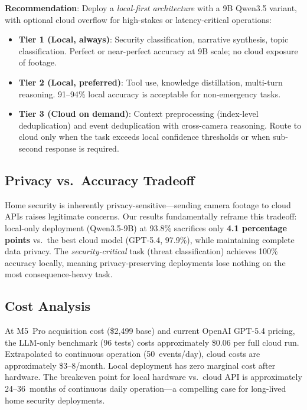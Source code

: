 \documentclass[onecolumn,10pt]{IEEEtran}
\begin{document}
\textbf{Recommendation}: Deploy a \emph{local-first architecture}
with a 9B Qwen3.5 variant, with optional cloud overflow for
high-stakes or latency-critical operations:
\begin{itemize}[nosep]
    \item \textbf{Tier 1 (Local, always)}: Security classification,
    narrative synthesis, topic classification. Perfect or near-perfect
    accuracy at 9B scale; no cloud exposure of footage.
    \item \textbf{Tier 2 (Local, preferred)}: Tool use, knowledge
    distillation, multi-turn reasoning. 91--94\% local accuracy is
    acceptable for non-emergency tasks.
    \item \textbf{Tier 3 (Cloud on demand)}: Context preprocessing
    (index-level deduplication) and event deduplication with
    cross-camera reasoning. Route to cloud only when the task exceeds
    local confidence thresholds or when sub-second response is required.
\end{itemize}

\subsection{Privacy vs.\ Accuracy Tradeoff}

Home security is inherently privacy-sensitive---sending camera footage
to cloud APIs raises legitimate concerns. Our results fundamentally
reframe this tradeoff: local-only deployment (Qwen3.5-9B) at 93.8\%
sacrifices only \textbf{4.1 percentage points} vs.\ the best cloud
model (GPT-5.4, 97.9\%), while maintaining complete data privacy.
The \emph{security-critical} task (threat classification) achieves
100\% accuracy locally, meaning privacy-preserving deployments lose
nothing on the most consequence-heavy task.

\subsection{Cost Analysis}

At M5~Pro acquisition cost (\$2,499 base) and current OpenAI GPT-5.4
pricing, the LLM-only benchmark (96 tests) costs approximately
\$0.06 per full cloud run. Extrapolated to continuous operation
(50~events/day), cloud costs are approximately \$3--8/month.
Local deployment has zero marginal cost after hardware. The breakeven
point for local hardware vs.\ cloud API is approximately
24--36~months of continuous daily operation---a compelling case
for long-lived home security deployments.
\end{document}
